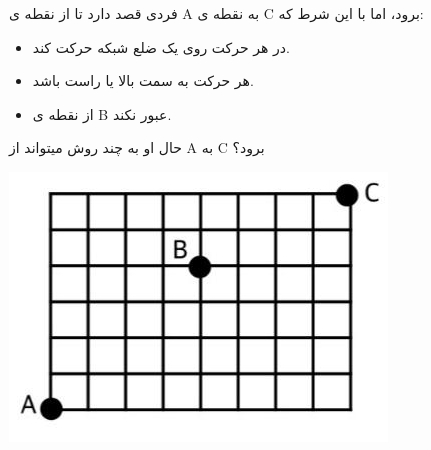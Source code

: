 \exercise
فردی قصد دارد تا از نقطه ی A به نقطه ی C برود، اما با این شرط که:
\begin{itemize}
    \item 
   در هر حرکت روی یک ضلع شبکه حرکت کند.

    \item 
 هر حرکت به سمت بالا یا راست باشد.
 
	\item 
از نقطه ی B عبور نکند.
\end{itemize}

حال او به چند روش میتواند از A به C برود؟

    \begin{center}
     	\includegraphics[scale=0.2]{./6.png}
    \end{center}